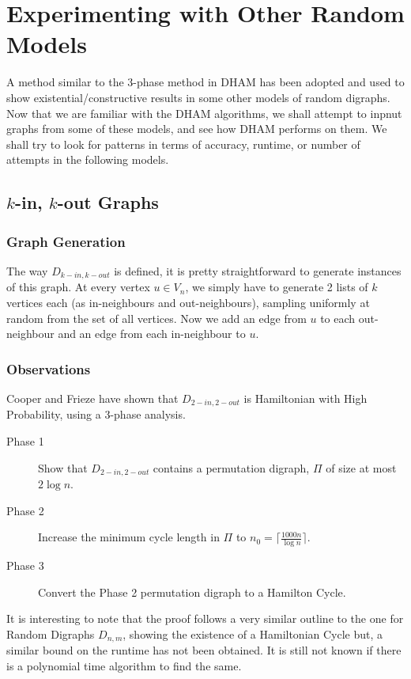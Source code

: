 
\chapter{Experimenting with Other Random Models}
\label{ch:exp}
\vspace{2em}

A method similar to the 3-phase method in DHAM has been adopted and used to show existential/constructive results in some other models of random digraphs. Now that we are familiar with the DHAM algorithms, we shall attempt to inpnut graphs from some of these models, and see how DHAM performs on them. We shall try to look for patterns in terms of accuracy, runtime, or number of attempts in the following models.

\section{$k$-in, $k$-out Graphs}
\subsection{Graph Generation}
The way $D_{k-in, k-out}$ is defined, it is pretty straightforward to generate instances of this graph. At every vertex $u\in V_n$, we simply have to generate 2 lists of $k$ vertices each (as in-neighbours and out-neighbours), sampling uniformly at random from the set of all vertices. Now we add an edge from $u$ to each out-neighbour and an edge from each in-neighbour to $u$.
\subsection{Observations}
Cooper and Frieze \cite{cooper:kinout} have shown that $D_{2-in, 2-out}$ is Hamiltonian with High Probability, using a 3-phase analysis. 

\begin{description}
\item[Phase 1] Show that $D_{2-in, 2-out}$ contains a permutation digraph, $\Pi$ of size at most $2\log n$.
\item[Phase 2] Increase the minimum cycle length in $\Pi$ to $n_0 = \Big\lceil \frac{1000n}{\log n} \Big\rceil$.
\item[Phase 3] Convert the Phase 2 permutation digraph to a Hamilton Cycle.
\end{description}
It is interesting to note that the proof follows a very similar outline to the one for Random Digraphs $D_{n, m}$, showing the existence of a Hamiltonian Cycle but, a similar bound on the runtime has not been obtained. It is still not known if there is a polynomial time algorithm to find the same.

